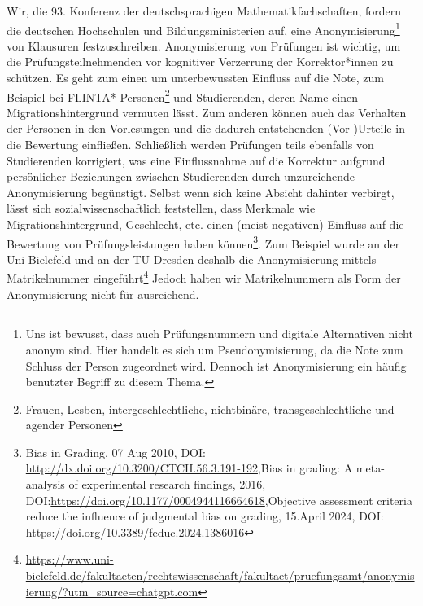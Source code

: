 \documentclass[DIV=calc]{scrartcl}
\begin{document}
Wir, die 93. Konferenz der deutschsprachigen Mathematikfachschaften, fordern die deutschen Hochschulen und Bildungsministerien auf, eine Anonymisierung\footnote{Uns ist bewusst, dass auch Prüfungsnummern und digitale Alternativen nicht anonym sind. Hier handelt es sich um Pseudonymisierung, da die Note zum Schluss der Person zugeordnet wird. Dennoch ist Anonymisierung ein häufig benutzter Begriff zu diesem Thema.} von Klausuren festzuschreiben. Anonymisierung von Prüfungen ist wichtig, um die Prüfungsteilnehmenden vor kognitiver Verzerrung der Korrektor*innen zu schützen. Es geht zum einen um unterbewussten Einfluss auf die Note, zum Beispiel bei FLINTA* Personen\footnote{Frauen, Lesben, intergeschlechtliche, nichtbinäre, transgeschlechtliche und agender Personen} und Studierenden, deren Name einen Migrationshintergrund vermuten lässt. Zum anderen können auch das Verhalten der Personen in den Vorlesungen und die dadurch entstehenden (Vor-)Urteile in die Bewertung einfließen. Schließlich werden Prüfungen teils ebenfalls von Studierenden korrigiert, was eine Einflussnahme auf die Korrektur aufgrund persönlicher Beziehungen zwischen Studierenden durch unzureichende Anonymisierung begünstigt. Selbst wenn sich keine Absicht dahinter verbirgt, lässt sich sozialwissenschaftlich feststellen, dass Merkmale wie Migrationshintergrund, Geschlecht, etc. einen (meist negativen) Einfluss auf die Bewertung von Prüfungsleistungen haben können\footnote{Bias in Grading, 07 Aug 2010, DOI: \url{http://dx.doi.org/10.3200/CTCH.56.3.191-192},Bias in grading: A meta-analysis of experimental research findings, 2016, DOI:\url{https://doi.org/10.1177/0004944116664618},Objective assessment criteria reduce the influence of judgmental bias on grading, 15.April 2024, DOI: \url{https://doi.org/10.3389/feduc.2024.1386016}}. Zum Beispiel wurde an der Uni Bielefeld und an der TU Dresden deshalb die Anonymisierung mittels Matrikelnummer eingeführt\footnote{\url{https://www.uni-bielefeld.de/fakultaeten/rechtswissenschaft/fakultaet/pruefungsamt/anonymisierung/?utm_source=chatgpt.com}}
Jedoch halten wir Matrikelnummern als Form der Anonymisierung nicht für ausreichend.
\end{document}
